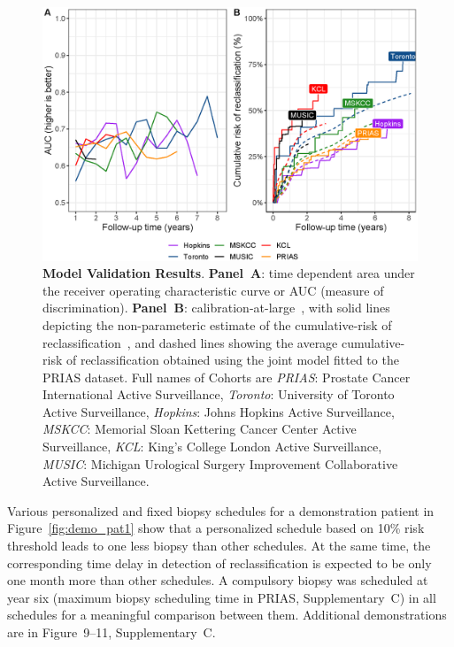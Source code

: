 \begin{figure}
\centerline{\includegraphics[width=\columnwidth]{images/auc_beforecalib.eps}}
\caption{\textbf{Model Validation Results}. \textbf{Panel~A}: time dependent area under the receiver operating characteristic curve or AUC (measure of discrimination). \textbf{Panel~B}: calibration-at-large~\citep{royston2013external,steyerberg2010assessing}, with solid lines depicting the non-parameteric estimate of the cumulative-risk of reclassification~\citep{turnbull1976empirical}, and dashed lines showing the average cumulative-risk of reclassification obtained using the joint model fitted to the PRIAS dataset. Full names of Cohorts are \textit{PRIAS}: Prostate Cancer International Active Surveillance, \textit{Toronto}: University of Toronto Active Surveillance, \textit{Hopkins}: Johns Hopkins Active Surveillance, \textit{MSKCC}: Memorial Sloan Kettering Cancer Center Active Surveillance, \textit{KCL}: King's College London Active Surveillance, \textit{MUSIC}: Michigan Urological Surgery Improvement Collaborative Active Surveillance.}
\label{fig:auc_beforecalib}
\end{figure}

Various personalized and fixed biopsy schedules for a demonstration patient in Figure~\ref{fig:demo_pat1} show that a personalized schedule based on 10\% risk threshold leads to one less biopsy than other schedules. At the same time, the corresponding time delay in detection of reclassification is expected to be only one month more than other schedules. A compulsory biopsy was scheduled at year six (maximum biopsy scheduling time in PRIAS, Supplementary~C) in all schedules for a meaningful comparison between them. Additional demonstrations are in Figure~9--11, Supplementary~C.